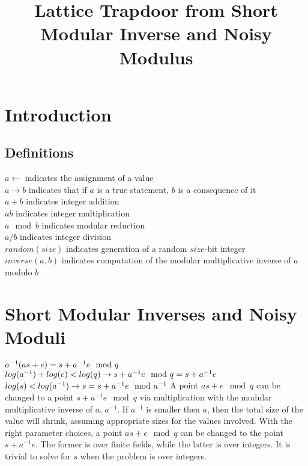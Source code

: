 \documentclass[preprint]{iacrtrans}
\author{}
\institute{}
\title[Lattice Trapdoor from Short Modular Inverse and Noisy Modulus]{Lattice Trapdoor from Short Modular Inverse and Noisy Modulus}
\begin{document}
\maketitle


\begin{abstract}
\todo{}
 \end{abstract}

\section{Introduction}
\todo{}

\subsection{Definitions}
$a \leftarrow$ indicates the assignment of a value\\
$a \rightarrow b$ indicates that if $a$ is a true statement, $b$ is a consequence of it\\
$a + b$ indicates integer addition\\
$a b$ indicates integer multiplication\\
$a \mod b$ indicates modular reduction\\
$a / b$ indicates integer division\\
$random(size)$ indicates generation of a random $size$-bit integer\\
$inverse(a, b)$ indicates computation of the modular multiplicative inverse of $a$ modulo $b$\\

\section{Short Modular Inverses and Noisy Moduli}
$a^{-1} (a s + e) = s + a^{-1} e \mod q\\ \\$
$log(a^{-1}) + log(e) < log(q) \rightarrow s + a^{-1} e \mod q = s + a^{-1} e\\ \\$
$log(s) < log(a^{-1}) \rightarrow s = s + a^{-1} e \mod a^{-1}\\ \\$
A point $a s + e \mod q$  can be changed to a point $s + a^{-1} e \mod q$ via multiplication with the modular multiplicative inverse of $a$, $a^{-1}$. If $a^{-1}$ is smaller then $a$, then the total size of the value will shrink, assuming appropriate sizes for the values involved. With the right parameter choices, a point $a s + e \mod q$ can be changed to the point $s + a^{-1} e$. The former is over finite fields, while the latter is over integers. It is trivial to solve for $s$ when the problem is over integers.
\end{document}
